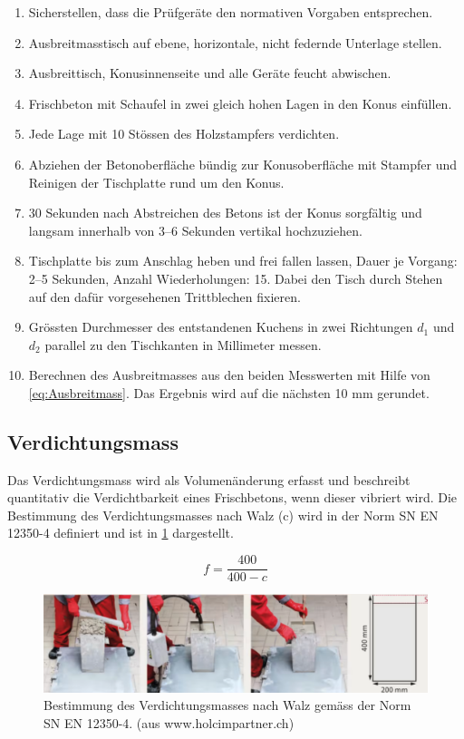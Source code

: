 \begin{enumerate}
    \item Sicherstellen, dass die Prüfgeräte den normativen Vorgaben entsprechen.
    \item Ausbreitmasstisch auf ebene, horizontale, nicht federnde Unterlage stellen.
    \item Ausbreittisch, Konusinnenseite und alle Geräte feucht abwischen.
    \item Frischbeton mit Schaufel in zwei gleich hohen Lagen in den Konus einfüllen.
    \item Jede Lage mit 10 Stössen des Holzstampfers verdichten.
    \item Abziehen der Betonoberfläche bündig zur Konusoberfläche mit Stampfer und Reinigen der Tischplatte rund um den Konus.
    \item 30 Sekunden nach Abstreichen des Betons ist der Konus sorgfältig und langsam innerhalb von 3–6 Sekunden vertikal hochzuziehen.
    \item Tischplatte bis zum Anschlag heben und frei fallen lassen, Dauer je Vorgang: 2–5 Sekunden, Anzahl Wiederholungen: 15. Dabei den Tisch durch Stehen auf den dafür vorgesehenen Trittblechen fixieren.
    \item Grössten Durchmesser des entstandenen Kuchens in zwei Richtungen $d_1$ und $d_2$ parallel zu den Tischkanten in Millimeter messen.
    \item Berechnen des Ausbreitmasses aus den beiden Messwerten mit Hilfe von  \cref{eq:Ausbreitmass}.  Das Ergebnis wird auf die nächsten 10 mm gerundet.
\end{enumerate}


\subsection*{Verdichtungsmass}
Das Verdichtungsmass wird als Volumenänderung erfasst und beschreibt quantitativ die Verdichtbarkeit eines Frischbetons, wenn dieser vibriert wird. Die Bestimmung des Verdichtungsmasses nach Walz (c) wird in der Norm SN EN 12350-4 definiert und ist in \cref{fig:BestimmungVerdichtungsmass} dargestellt.

\begin{equation}
	f = \dfrac{400}{400-c}
	\label{eq:Verdichtungsmass}
\end{equation}


\begin{figure}[h!bt]
	\centering
	\includegraphics[width=1.0\linewidth]{Bilder/Verdichtungsmass}
	\caption{Bestimmung des Verdichtungsmasses nach Walz gemäss der Norm SN EN 12350-4. (aus www.holcimpartner.ch)}
	\label{fig:BestimmungVerdichtungsmass}
\end{figure}




